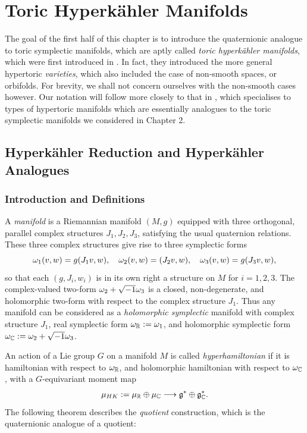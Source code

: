 \chapter{Toric Hyperk{\"a}hler Manifolds}

The goal of the first half of this chapter is to introduce the quaternionic analogue to toric symplectic manifolds, which are aptly called \emph{toric hyperk{\"a}hler manifolds}, which were first introduced in \cite{BD00}. In fact, they introduced the more general hypertoric \emph{varieties}, which also included the case of non-smooth spaces, or orbifolds. For brevity, we shall not concern ourselves with the non-smooth cases however. Our notation will follow more closely to that in \cite{Pro04}, which specialises to types of hypertoric manifolds which are essentially analogues to the toric symplectic manifolds we considered in Chapter 2.

\section{Hyperk{\"a}hler Reduction and Hyperk{\"a}hler Analogues}

\subsection{Introduction and Definitions}

A \emph{\HK manifold} is a Riemannian manifold $(M,g)$ equipped with three orthogonal, parallel complex structures $J_{1}, J_{2}, J_{3}$, satisfying the usual quaternion relations. These three complex structures give rise to three symplectic forms
$$
	\omega_{1}(v,w) = g(J_{1}v,w),\quad \omega_{2}(v,w) = (J_{2}v,w),\quad \omega_{3}(v,w) = g(J_{3}v,w),
$$
so that each $(g,J_{i},w_{i})$ is in its own right a \K structure on $M$ for $i = 1,2,3$. The complex-valued two-form $\omega_{2} + \sqrt{-1}\omega_{3}$ is a closed, non-degenerate, and holomorphic two-form with respect to the complex structure $J_{1}$. Thus any \HK manifold can be considered as a \emph{holomorphic symplectic} manifold with complex structure $J_{1}$, real symplectic form $\omega_{\mathbb{R}} := \omega_{1}$, and holomorphic symplectic form $\omega_{\mathbb{C}} := \omega_{2} + \sqrt{-1}\omega_{3}$.

An action of a Lie group $G$ on a \HK manifold $M$ is called \emph{hyperhamiltonian} if it is hamiltonian with respect to $\omega_{\mathbb{R}}$, and holomorphic hamiltonian with respect to $\omega_{\mathbb{C}}$, with a $G$-equivariant moment map
$$
	\mu_{HK} := \mu_{\mathbb{R}} \oplus \mu_{\mathbb{C}} \longrightarrow \mathfrak{g}^{\ast} \oplus \mathfrak{g}_{\mathbb{C}}^{\ast}.
$$
The following theorem describes the \emph{\HK quotient} construction, which is the quaternionic analogue of a \K quotient:


